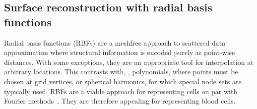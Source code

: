 \subsection{Surface reconstruction with radial basis functions}\label{sec:rbf-interpolation}

Radial basis functions (RBFs) are a meshfree approach to scattered data approximation
where structural information is encoded purely as point-wise distances. With some
exceptions, they are an appropriate tool for interpolation at arbitrary locations. This
contrasts with, , polynomials, where points must be chosen at grid vertices,
or spherical harmonics, for which special node sets are typically used. RBFs are a viable
approach for representing cells on par with Fourier methods~\cite{Shankar:2013ki}. They
are therefore appealing for representing blood cells.

